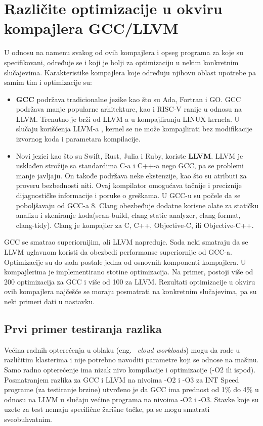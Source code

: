 \documentclass[a4paper]{article}
\begin{document}
\section{Različite optimizacije u okviru kompajlera GCC/LLVM}
\label{subsec:razlike}

U odnosu na namenu svakog od ovih kompajlera  i opseg programa za koje su specifikovani, određuje se i koji je bolji za optimizaciju u nekim konkretnim slučajevima.
Karakteristike kompajlera koje određuju njihovu oblast upotrebe pa samim tim i optimizacije su: 
\begin{itemize}
  \item \textbf{GCC} podržava tradicionalne jezike kao što su Ada, Fortran i GO.
         GCC podržava manje popularne arhitekture, kao i RISC-V ranije u odnosu na LLVM.
         Trenutno je brži od LLVM-a u  kompajliranju LINUX kernela. 
         U slučaju korišćenja LLVM-a , kernel se ne može kompajlirati bez modifikacije izvornog koda i parametara kompilacije.
  \item  Novi jezici  kao što su Swift, Rust, Julia i Ruby, koriste \textbf{LLVM}.
          LLVM je usklađen strožije sa standardima C-a i C++-a nego GCC, pa se problemi manje javljaju.
          On takođe podržava neke ekstenzije, kao što su atributi za proveru bezbednosti niti.
          Ovaj kompilator omogućava tačnije i preciznije dijagnostičke informacije i poruke o greškama. U GCC-u su počele da se poboljšavaju od GCC-a 8.
          Clang obezbeđuje dodatne korisne alate za statičku analizu i skeniranje koda(scan-build, clang static analyzer, clang-format, clang-tidy).
          Clang je kompajler  za C, C++, Objective-C, ili Objective-C++.
\end{itemize}
GCC se smatrao superiornijim, ali LLVM napreduje. Sada neki smatraju da se LLVM uglavnom koristi da obezbedi performanse superiornije od GCC-a.
\\ Optimizacije su do sada postale jedna od osnovnih komponenti kompajlera. 
U kompajlerima je implementirano stotine optimizacija. 
Na primer, postoji više od 200 optimizacija za GCC i više od 100 za LLVM.  
Rezultati optimizacije u okviru ovih kompajlera najčešće se moraju posmatrati na konkretnim slučajevima, pa  su neki primeri dati u nastavku.

\subsection{Prvi primer testiranja razlika}
\label{subsec:primer1}
Većina radnih opterećenja u oblaku (eng. ~{\em cloud workloads}) mogu da rade u različitim klasterima i nije potrebno navoditi parametre koji se odnose na mašinu. 
Samo radno opterećenje ima nizak nivo kompilacije i optimizacije (-O2 ili ispod).
Posmatranjem razlika za GCC i LLVM na nivoima -O2 i -O3 za INT Speed programe (za testiranje brzine) utvrđeno je da 
GCC ima prednost od 1\% do 4\% u odnosu na LLVM u slučaju većine programa na nivoima -O2 i -O3. 
Stavke koje su uzete za test nemaju specifične žarišne tačke, pa se mogu smatrati sveobuhvatnim.
\end{document}
